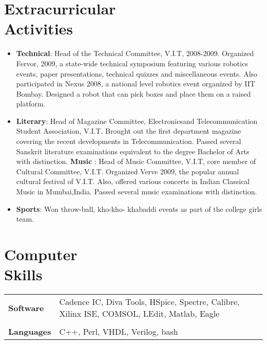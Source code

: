 \documentclass[margin]{res}
\begin{document}
\begin{resume}
\section{Extracurricular \\ Activities}
\begin{itemize}
\item
{\bf Technical}: Head of the Technical Committee, V.I.T, 2008-2009. Organized Fervor, 2009, a state-wide technical symposium featuring various robotics events, paper presentations, technical quizzes and miscellaneous events. Also participated in Nexus 2008, a national level robotics event organized by IIT Bombay. Designed a robot that can pick boxes and place them on a raised platform.
\item
{\bf Literary}: Head of Magazine Committee, Electronicsand Telecommunication Student Association, V.I.T. Brought out the first department 
magazine covering the recent developments in Telecommunication. Passed several Sanskrit literature examinations equivalent to the degree Bachelor of Arts with distinction.
{\bf Music} : Head of Music Committee, V.I.T, core member of Cultural Committee, V.I.T. Organized Verve 2009, the popular annual cultural festival of V.I.T. Also, offered various concerts in Indian Classical Music in Mumbai,India. Passed several music examinations with distinction.
\item
{\bf Sports}: Won throw-ball, kho-kho- khabaddi events as part of the college girls team.
\end{itemize}
\section{Computer \\ Skills}
   \begin{tabular}{l p{3.5in}}
        {\bf Software} &  Cadence IC, Diva Tools, HSpice, Spectre, Calibre, Xilinx ISE, COMSOL, LEdit, Matlab, Eagle \\\\
    {\bf Languages} & C++, Perl, VHDL, Verilog, bash
 \end{tabular}


\end{resume} 
\end{document}
